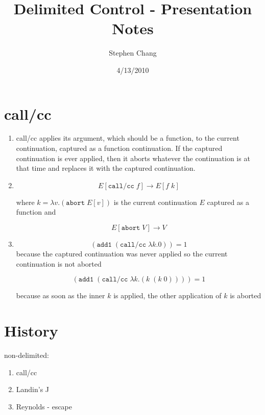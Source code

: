\documentclass[letterpaper]{llncs}
\newcommand{\app}[2]{ \ensuremath{ #1 \; #2 } }
\newcommand{\appp}[2]{ \ensuremath{ (\app{#1}{#2}) } }
\newcommand{\lam}[2]{ \ensuremath{ \lambda #1.#2 } }
\newcommand{\inhole}[2]{ \ensuremath{ #1[#2] } }
\newcommand{\createop}[1]{\texttt{#1}\xspace}
\newcommand{\callcc}{\createop{call/cc}}
\newcommand{\abort}{\createop{abort}}
\newcommand{\addone}{\createop{add1}}
\begin{document}

\title{Delimited Control - Presentation Notes}
\author{Stephen Chang}
\institute{}
\date{4/13/2010}
\maketitle

\section*{call/cc}
\begin{enumerate}
	\item call/cc applies its argument, which should be a function, to the current continuation, captured as a function continuation. If the captured continuation is ever applied, then it aborts whatever the continuation is at that time and replaces it with the captured continuation.
	\item 
	$$\inhole{E}{ \app{\callcc}{f} } \rightarrow \inhole{E}{ \app{f}{k} }$$
	
	where $k = \lam{v}{ \appp{ \abort }{ \inhole{E}{v} } }$ is the current continuation $E$ captured as a function and
	
	$$\inhole{E}{ \app{ \abort }{ V } } \rightarrow V$$
	\item
	$$\appp{ \addone }{ \appp{\callcc}{ \lam{k}{0} } } = 1$$
	because the captured continuation was never applied so the current continuation is not aborted
	
	$$\appp{ \addone }{ \appp{\callcc}{ \lam{k}{ \appp{k}{\appp{k}{0}} } } } = 1$$
	
	because as soon as the inner $k$ is applied, the other application of $k$ is aborted
\end{enumerate}

\section*{History}
non-delimited:
\begin{enumerate}
	\item call/cc
	\item Landin's J
	\item Reynolds - escape
\end{enumerate}
\end{document}
